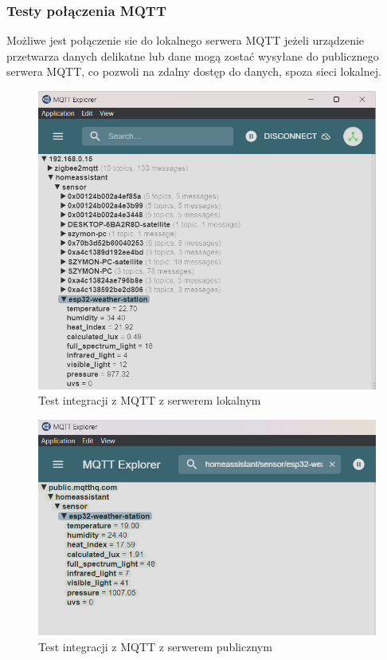 \documentclass[12pt,a4paper]{article}
\begin{document}
\subsubsection{Testy połączenia MQTT}
Możliwe jest połączenie sie do lokalnego serwera MQTT jeżeli urządzenie przetwarza danych delikatne lub dane mogą zostać wysyłane do publicznego serwera MQTT, co pozwoli na zdalny dostęp do danych, spoza sieci lokalnej.
\begin{figure}[H]
    \centering
    \includegraphics[width=\textwidth]{mqtt1.png}
    \caption{Test integracji z MQTT z serwerem lokalnym}
\end{figure}

\begin{figure}[H]
    \centering
    \includegraphics[width=\textwidth]{mqtt-public.png}
    \caption{Test integracji z MQTT z serwerem publicznym}
\end{figure}
\end{document}
